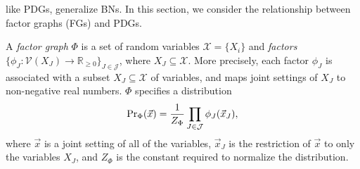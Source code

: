 \documentclass[letterpaper]{article} %
\theoremstyle{plain}
\theoremstyle{definition}
\theoremstyle{remark}
\newcommand{\V}{\mathcal V}
\newcommand\GFE{\mathit{G\mkern-4mu F\mkern-4.5mu E}}
\begin{document}
like PDGs, generalize BNs.
In this section, we consider the relationship between factor graphs (FGs) and PDGs.
\begin{defn}
 A \emph{factor graph} $\Phi$ is a set of random variables
        $\mathcal X = \{X_i\}$ and \emph{factors}
       $\{\phi_J\colon \V(X_J) \to \mathbb R_{\geq0}\}_{J \in
\mathcal J }$,
where $X_J \subseteq \mathcal X$.  
More precisely, each factor $\phi_J$ is associated with a subset
$X_J\subseteq \mathcal{X}$ of variables, and maps
joint settings of $X_J$ to non-negative real numbers.
%
$\Phi$ specifies a distribution
\[ {\Pr}_{\Phi}(\vec x) = \frac{1}{Z_{\Phi}}
 	\prod_{J \in \cal J} \phi_J(\vec x_J), \]
where $\vec{x}$ is a joint setting of all of the variables,
 $\vec{x}_J$ is the restriction of $\vec{x}$ to only the
 variables $X_J$, and $Z_{\Phi}$ is the constant required to
 normalize the distribution.  
\end{defn}



\end{document}
